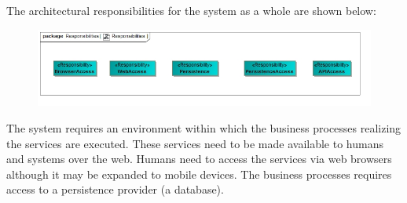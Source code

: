 The architectural responsibilities for the system as a whole are shown below:\\
\begin{figure}[H]
\centering
\includegraphics[scale=0.6]{../images/arch_resp.jpg}
\end{figure}

The system requires an environment within which the business processes realizing the services
are executed. These services need to be made available to humans and systems over the web. Humans need to access the services via web browsers although it may be expanded to mobile devices. The business processes requires access to a persistence provider (a database).